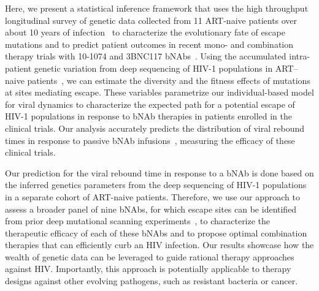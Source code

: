 \documentclass[aps,prx,noshowpacs,twocolumn,nofootinbib]{revtex4-2}
\begin{document}
Here, we present a statistical inference framework that uses the high throughput longitudinal survey of genetic data collected from 11 ART-naive patients over about 10 years of infection~\cite{Zanini:2015gg} to characterize the evolutionary fate of escape mutations and to predict patient outcomes in recent mono- and combination therapy  trials with 10-1074 and 3BNC117 bNAbs~\cite{Caskey:2015hm,Caskey:2017el,bar-onSafetyAntiviralActivity2018}. Using the accumulated intra-patient genetic variation from deep sequencing of HIV-1 populations in ART--naive patients~\cite{Zanini:2015gg}, we can estimate the diversity and the fitness effects of mutations at sites mediating escape. These variables parametrize our  individual-based model  for viral dynamics to characterize the expected path for a potential escape of HIV-1 populations in response to bNAb therapies in patients enrolled in the clinical trials. Our analysis accurately predicts the distribution of viral rebound times in response to passive  bNAb  infusions~\cite{Caskey:2015hm,Caskey:2017el,bar-onSafetyAntiviralActivity2018}, measuring the efficacy of these clinical trials. 

Our prediction for the viral rebound time in response to a bNAb is done based on the inferred genetics parameters from the deep sequencing of HIV-1 populations in a separate cohort of ART-naive patients. Therefore, we use our approach to  assess a broader panel of nine bNAbs, for which escape sites can be identified from prior deep mutational scanning experiments~\cite{Dingens:2019fd}, to characterize the therapeutic efficacy of each of these bNAbs and to propose optimal combination therapies that can efficiently curb an HIV infection. Our results showcase how the wealth of genetic data can be leveraged to guide rational therapy approaches against HIV. Importantly, this approach is potentially applicable to therapy designs against other evolving pathogens, such as resistant bacteria or cancer. 
\end{document}
